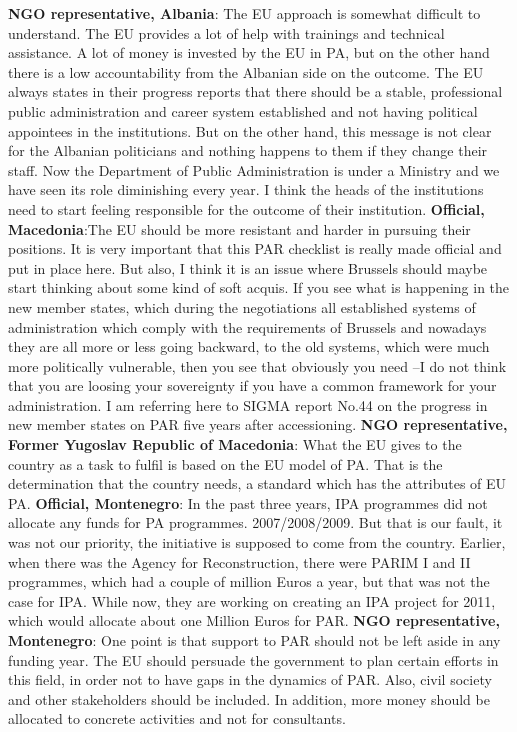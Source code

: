 \textbf{NGO representative, Albania}: The EU approach is somewhat difficult to understand. The EU provides a lot of help with trainings and technical assistance. A lot of money is invested by the EU in PA, but on the other hand there is a low accountability from the Albanian side on the outcome. The EU always states in their progress reports that there should be a stable, professional public administration and career system established and not having political appointees in the institutions. But on the other hand, this message is not clear for the Albanian politicians and nothing happens to them if they change their staff. Now the Department of Public Administration is under a Ministry and we have seen its role diminishing every year.  I think the heads of the institutions need to start feeling responsible for the outcome of their institution. 
\textbf{Official, Macedonia}:The EU should be more resistant and harder in pursuing their positions. It is very important that this PAR checklist is really made official and put in place here. But also, I think it is an issue where Brussels should maybe start thinking about some kind of soft acquis. If you see what is happening in the new member states, which during the negotiations all established systems of administration which comply with the requirements of Brussels and nowadays they are all more or less going backward, to the old systems, which were much more politically vulnerable, then you see that obviously you need –I do not think that you are loosing your sovereignty if you have a common framework for your administration. I am referring here to SIGMA report No.44 on the progress in new member states on PAR five years after accessioning.
\textbf{NGO representative, Former Yugoslav Republic of Macedonia}: What the EU gives to the country as a task to fulfil is based on the EU model of PA. That is the determination that the country needs, a standard which has the attributes of EU PA.
\textbf{Official, Montenegro}: In the past three years, IPA programmes did not allocate any funds for PA programmes. 2007/2008/2009. But that is our fault, it was not our priority, the initiative is supposed to come from the country. Earlier, when there was the Agency for Reconstruction, there were PARIM I and II programmes, which had a couple of million Euros a year, but that was not the case for IPA. While now, they are working on creating an IPA project for 2011, which would allocate about one Million Euros for PAR. 
\textbf{NGO representative, Montenegro}: One point is that support to PAR should not be left aside in any funding year. The EU should persuade the government to plan certain efforts in this field, in order not to have gaps in the dynamics of  PAR. Also, civil society and other stakeholders should be included. In addition, more money should be allocated to concrete activities and not for consultants.\newpage

